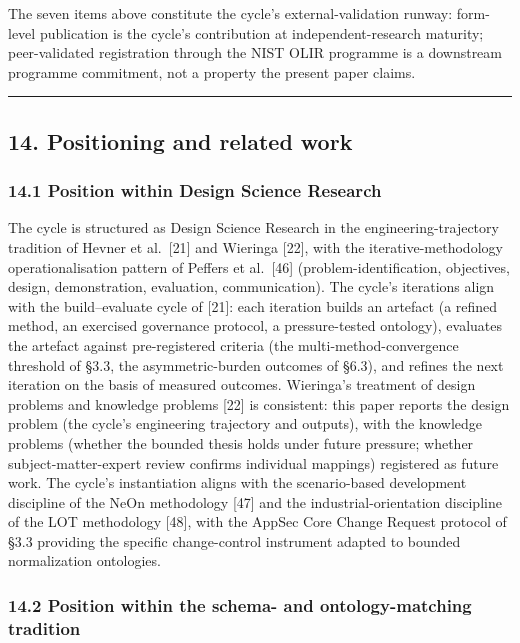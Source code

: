 \documentclass[
]{article}
\begin{document}
The seven items above constitute the cycle's external-validation runway:
form-level publication is the cycle's contribution at
independent-research maturity; peer-validated registration through the
NIST OLIR programme is a downstream programme commitment, not a property
the present paper claims.

\begin{center}\rule{0.5\linewidth}{0.5pt}\end{center}

\subsection{14. Positioning and related
work}\label{positioning-and-related-work}

\subsubsection{14.1 Position within Design Science
Research}\label{position-within-design-science-research}

The cycle is structured as Design Science Research in the
engineering-trajectory tradition of Hevner et al.~{[}21{]} and Wieringa
{[}22{]}, with the iterative-methodology operationalisation pattern of
Peffers et al.~{[}46{]} (problem-identification, objectives, design,
demonstration, evaluation, communication). The cycle's iterations align
with the build--evaluate cycle of {[}21{]}: each iteration builds an
artefact (a refined method, an exercised governance protocol, a
pressure-tested ontology), evaluates the artefact against pre-registered
criteria (the multi-method-convergence threshold of §3.3, the
asymmetric-burden outcomes of §6.3), and refines the next iteration on
the basis of measured outcomes. Wieringa's treatment of design problems
and knowledge problems {[}22{]} is consistent: this paper reports the
design problem (the cycle's engineering trajectory and outputs), with
the knowledge problems (whether the bounded thesis holds under future
pressure; whether subject-matter-expert review confirms individual
mappings) registered as future work. The cycle's instantiation aligns
with the scenario-based development discipline of the NeOn methodology
{[}47{]} and the industrial-orientation discipline of the LOT
methodology {[}48{]}, with the AppSec Core Change Request protocol of
§3.3 providing the specific change-control instrument adapted to bounded
normalization ontologies.

\subsubsection{14.2 Position within the schema- and ontology-matching
tradition}\label{position-within-the-schema--and-ontology-matching-tradition}
\end{document}
